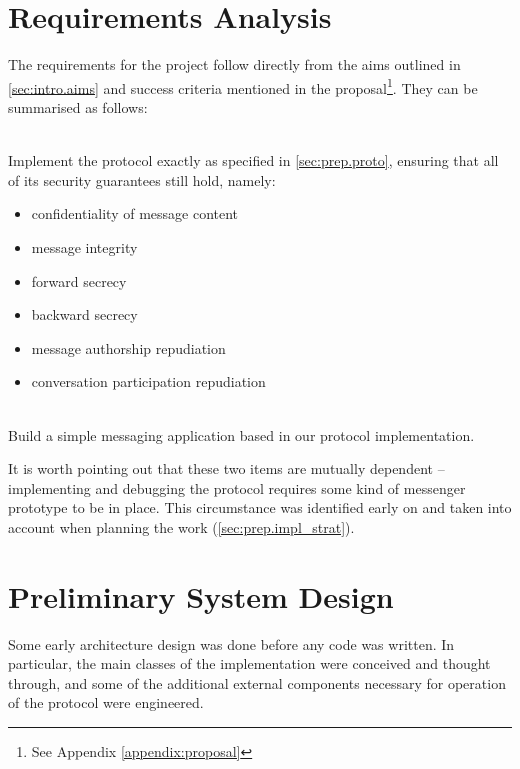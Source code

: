\documentclass[a4paper, 12pt]{report}
\begin{document}
\section{Requirements Analysis}
\label{sec:prep.requirements}
The requirements for the project follow directly from the aims outlined in \cref{sec:intro.aims} and success criteria mentioned in the proposal\footnote{See Appendix \ref{appendix:proposal}}. They can be summarised as follows:
\begin{description}[labelindent=0.5cm, leftmargin=1.3cm, rightmargin=0.5cm]
    \item[Implementing the protocol] \hfill \\
        Implement the protocol exactly as specified in \cref{sec:prep.proto}, ensuring that all of its security guarantees still hold, namely:
        \begin{itemize}
            \item confidentiality of message content
            \item message integrity
            \item forward secrecy
            \item backward secrecy
            \item message authorship repudiation
            \item conversation participation repudiation
        \end{itemize}


    \item[Construct a useable messaging application] \hfill \\
        Build a simple messaging application based in our protocol implementation.     
\end{description}
It is worth pointing out that these two items are mutually dependent -- implementing and debugging the protocol requires some kind of messenger prototype to be in place. This circumstance was identified early on and taken into account when planning the work (\cref{sec:prep.impl_strat}). \\


\section{Preliminary System Design}
\label{sec:prep.design}
Some early architecture design was done before any code was written. In particular, the main classes of the implementation were conceived and thought through, and some of the additional external components necessary for operation of the protocol were engineered.
\end{document}

